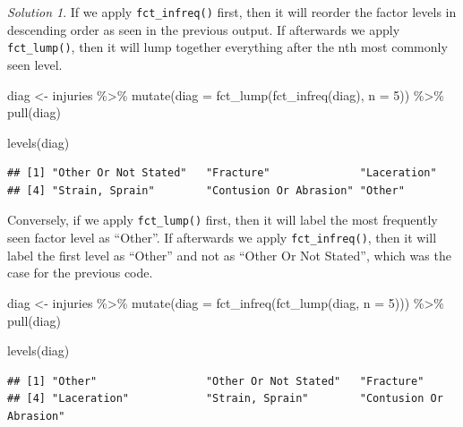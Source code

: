 \documentclass[
]{book}
\newenvironment{Shaded}{\begin{snugshade}}{\end{snugshade}}
\newcommand{\AttributeTok}[1]{\textcolor[rgb]{0.77,0.63,0.00}{#1}}
\newcommand{\DecValTok}[1]{\textcolor[rgb]{0.00,0.00,0.81}{#1}}
\newcommand{\FunctionTok}[1]{\textcolor[rgb]{0.00,0.00,0.00}{#1}}
\newcommand{\NormalTok}[1]{#1}
\newcommand{\OtherTok}[1]{\textcolor[rgb]{0.56,0.35,0.01}{#1}}
\newcommand{\SpecialCharTok}[1]{\textcolor[rgb]{0.00,0.00,0.00}{#1}}
\theoremstyle{definition}
\theoremstyle{definition}
\theoremstyle{definition}
\theoremstyle{definition}
\theoremstyle{remark}
\newtheorem*{solution}{Solution}
\begin{document}
\begin{solution}
If we apply \texttt{fct\_infreq()} first, then it will reorder the factor levels in
descending order as seen in the previous output. If afterwards we apply
\texttt{fct\_lump()}, then it will lump together everything after the nth most commonly
seen level.

\begin{Shaded}
\begin{Highlighting}[]
\NormalTok{diag }\OtherTok{\textless{}{-}}\NormalTok{ injuries }\SpecialCharTok{\%\textgreater{}\%}
  \FunctionTok{mutate}\NormalTok{(}\AttributeTok{diag =} \FunctionTok{fct\_lump}\NormalTok{(}\FunctionTok{fct\_infreq}\NormalTok{(diag), }\AttributeTok{n =} \DecValTok{5}\NormalTok{)) }\SpecialCharTok{\%\textgreater{}\%}
  \FunctionTok{pull}\NormalTok{(diag)}

\FunctionTok{levels}\NormalTok{(diag)}
\end{Highlighting}
\end{Shaded}

\begin{verbatim}
## [1] "Other Or Not Stated"   "Fracture"              "Laceration"           
## [4] "Strain, Sprain"        "Contusion Or Abrasion" "Other"
\end{verbatim}

Conversely, if we apply \texttt{fct\_lump()} first, then it will label the most
frequently seen factor level as ``Other''. If afterwards we apply \texttt{fct\_infreq()},
then it will label the first level as ``Other'' and not as ``Other Or Not Stated'',
which was the case for the previous code.

\begin{Shaded}
\begin{Highlighting}[]
\NormalTok{diag }\OtherTok{\textless{}{-}}\NormalTok{ injuries }\SpecialCharTok{\%\textgreater{}\%}
  \FunctionTok{mutate}\NormalTok{(}\AttributeTok{diag =} \FunctionTok{fct\_infreq}\NormalTok{(}\FunctionTok{fct\_lump}\NormalTok{(diag, }\AttributeTok{n =} \DecValTok{5}\NormalTok{))) }\SpecialCharTok{\%\textgreater{}\%}
  \FunctionTok{pull}\NormalTok{(diag)}

\FunctionTok{levels}\NormalTok{(diag)}
\end{Highlighting}
\end{Shaded}

\begin{verbatim}
## [1] "Other"                 "Other Or Not Stated"   "Fracture"             
## [4] "Laceration"            "Strain, Sprain"        "Contusion Or Abrasion"
\end{verbatim}

\end{solution}
\end{document}
